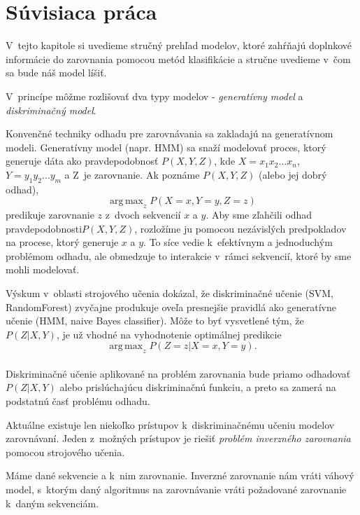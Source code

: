 \chapter{Súvisiaca práca}

V~tejto kapitole si uvedieme stručný prehľad modelov, ktoré zahŕňajú doplnkové informácie do zarovnania pomocou metód klasifikácie a stručne uvedieme v~čom sa bude náš model líšiť.

V~princípe môžme rozlišovať dva typy modelov - \textit{generatívny model} a \textit{diskriminačný model}.

Konvenčné techniky odhadu pre zarovnávania sa zakladajú na generatívnom modeli. Generatívny model (napr. HMM) sa snaží modelovať proces, ktorý generuje dáta ako pravdepodobnosť $P(X,Y,Z)$, kde $X = x_1x_2\dots x_n$, $Y = y_1y_2\dots y_m$ a Z~je zarovnanie. Ak poznáme $P(X,Y,Z)$ (alebo jej dobrý odhad),
$$\operatorname{ arg\,max}_z P(X = x,Y = y,Z = z)$$
predikuje zarovnanie $z$ z~dvoch sekvencií $x$ a $y$. Aby sme zľahčili odhad pravdepodobnosti$P(X,Y,Z)$, rozložíme ju pomocou nezávislých predpokladov na procese, ktorý generuje $x$ a $y$. To síce vedie k~efektívnym a jednoduchým problémom odhadu, ale obmedzuje to interakcie v~rámci sekvencií, ktoré by sme mohli modelovať. \cite{svmTrainingProteinsAlignment}

Výskum v~oblasti strojového učenia dokázal, že diskriminačné učenie (SVM, RandomForest) zvyčajne produkuje oveľa presnejšie pravidlá ako generatívne učenie (HMM, naive Bayes classifier). \cite{svmTrainingProteinsAlignment}
Môže to byť vysvetlené tým, že $P(Z|X,Y)$, je už vhodné na vyhodnotenie optimálnej predikcie
$$\operatorname{ arg\,max}_z P(Z = z|X = x,Y = y).$$
\cite{svmTrainingProteinsAlignment}\\
Diskriminačné učenie aplikované na problém zarovnania bude priamo odhadovať $P(Z|X,Y)$ alebo prislúchajúcu diskriminačnú funkciu, a preto sa zamerá na podstatnú časť problému odhadu. \cite{svmTrainingProteinsAlignment}

Aktuálne existuje len niekoľko prístupov k~diskriminačnému učeniu modelov zarovnávaní.
Jeden z~možných prístupov je riešiť \textit{problém inverzného zarovnania} pomocou strojového učenia. \cite{svmTrainingProteinsAlignment}

\begin{df}
Máme dané sekvencie a k~nim zarovnanie. Inverzné zarovnanie nám vráti váhový model, s~ktorým daný algoritmus na zarovnávanie vráti požadované zarovnanie k~daným sekvenciám.
\end{df}

